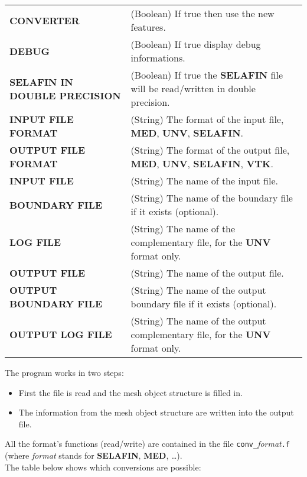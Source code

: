 \documentclass[a4paper,10pt]{article}
\newcommand{\slf}{\textbf{SELAFIN}\xspace}
\newcommand{\unv}{\textbf{UNV}\xspace}
\newcommand{\med}{\textbf{MED}\xspace}
\newcommand{\vtk}{\textbf{VTK}\xspace}
\begin{document}
\begin{tabular}{p{140pt}@{ : }p{200pt}}
\textbf{CONVERTER} & (Boolean) If true then use the new features.\\
\textbf{DEBUG} & (Boolean) If true display debug informations.\\
\textbf{SELAFIN IN DOUBLE PRECISION} & (Boolean) If true the \slf file will be read/written in double precision.\\
\textbf{INPUT FILE FORMAT} & (String) The format of the input file, \med, \unv, \slf.\\
\textbf{OUTPUT FILE FORMAT} & (String) The format of the output file, \med, \unv, \slf, \vtk.\\
\textbf{INPUT FILE} & (String) The name of the input file.\\
\textbf{BOUNDARY FILE} & (String) The name of the boundary file if it exists (optional).\\
\textbf{LOG FILE} & (String) The name of the complementary file, for the \unv format only.\\
\textbf{OUTPUT FILE} & (String) The name of the output file.\\
\textbf{OUTPUT BOUNDARY FILE} & (String) The name of the output boundary file if it exists (optional).\\
\textbf{OUTPUT LOG FILE} & (String) The name of the output complementary file, for the \unv format only.\\
\end{tabular}

The program works in two steps:
\begin{itemize}
\setlength{\itemsep}{1pt}
\setlength{\parskip}{0pt}
\setlength{\parsep}{0pt}
\item First the file is read and the mesh object structure is filled in.
\item The information from the mesh object structure are written into the output file.
\end{itemize}

All the format's functions (read/write) are contained in the file \verb+conv_+\textit{format}\verb+.f+ (where \textit{format} stands for \slf, \med, \ldots).\\

The table below shows which conversions are possible:
\end{document}

